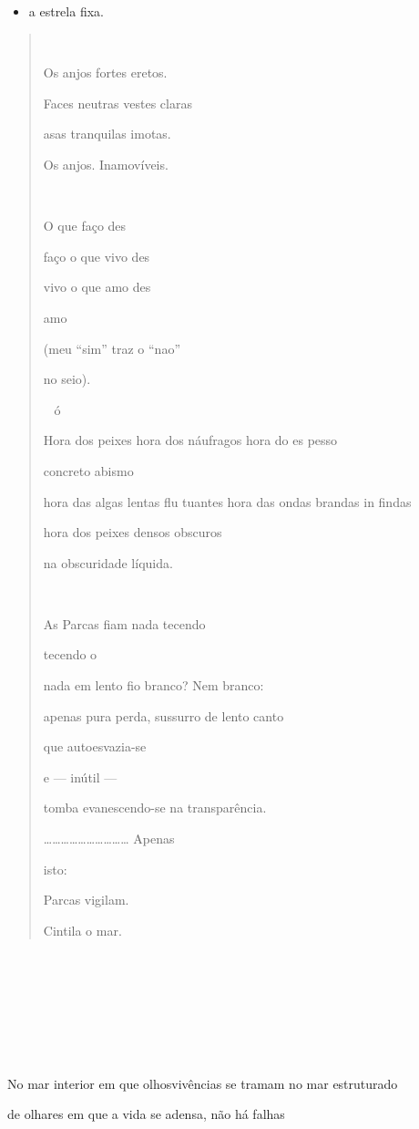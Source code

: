 \begin{itemize}
\item
  a estrela fixa.
\end{itemize}

\begin{quote}


Os anjos fortes eretos.

Faces neutras vestes claras

asas tranquilas imotas.

Os anjos. Inamovíveis.



O que faço des

faço o que vivo des

vivo o que amo des

amo

(meu ``sim'' traz o ``nao''

no seio).

ó

Hora dos peixes hora dos náufragos hora do es pesso

concreto abismo

hora das algas lentas flu tuantes hora das ondas brandas in findas

hora dos peixes densos obscuros

na obscuridade líquida.

 

As Parcas fiam nada tecendo

tecendo o

nada em lento fio branco? Nem branco:

apenas pura perda, sussurro de lento canto

que autoesvazia-se

e --- inútil ---

tomba evanescendo-se na transparência.

\ldots{}\ldots{}\ldots{}\ldots{}\ldots{}\ldots{}\ldots{}\ldots{}\ldots{}\ldots{}
Apenas

isto:

Parcas vigilam.

Cintila o mar.
\end{quote}









No mar interior em que olhosvivências se tramam no mar estruturado

de olhares em que a vida se adensa, não há falhas

